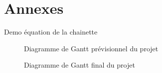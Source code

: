 \chapter{Annexes}
\label{annexe:gantt}

	Demo équation de la chainette

	\clearpage

	\begin{figure}[H]
		\centering
        \label{fig:gantt}
        \caption{Diagramme de Gantt prévisionnel du projet}
	\end{figure}

	\clearpage

	\begin{figure}[H]
		\centering
        \label{fig:gantt}
        \caption{Diagramme de Gantt final du projet}
	\end{figure}
